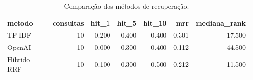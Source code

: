 \begin{table}
\caption{Comparação dos métodos de recuperação.}
\label{tab:recuperacao}
\begin{tabular}{lrrrrrr}
\toprule
metodo & consultas & hit_1 & hit_5 & hit_10 & mrr & mediana_rank \\
\midrule
TF-IDF & 10 & 0.200 & 0.400 & 0.400 & 0.301 & 17.500 \\
OpenAI & 10 & 0.000 & 0.300 & 0.400 & 0.112 & 44.500 \\
Híbrido RRF & 10 & 0.100 & 0.300 & 0.500 & 0.212 & 11.500 \\
\bottomrule
\end{tabular}
\end{table}
